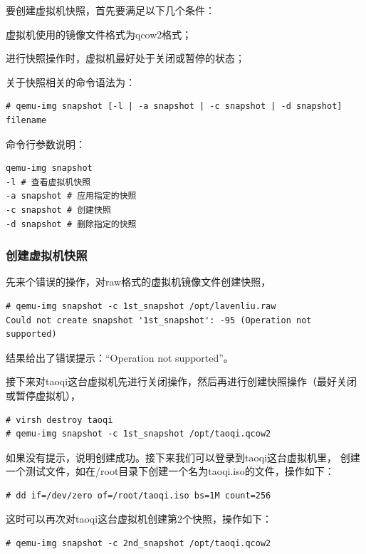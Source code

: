 要创建虚拟机快照，首先要满足以下几个条件：

虚拟机使用的镜像文件格式为qcow2格式；

进行快照操作时，虚拟机最好处于关闭或暂停的状态；

关于快照相关的命令语法为：

\begin{verbatim}
# qemu-img snapshot [-l | -a snapshot | -c snapshot | -d snapshot] filename
\end{verbatim}

命令行参数说明：

\begin{verbatim}
qemu-img snapshot 
-l # 查看虚拟机快照
-a snapshot # 应用指定的快照
-c snapshot # 创建快照
-d snapshot # 删除指定的快照
\end{verbatim}

\subsubsection{创建虚拟机快照}
\label{sec:createVmSnapShot}

先来个错误的操作，对raw格式的虚拟机镜像文件创建快照，

\begin{verbatim}
# qemu-img snapshot -c 1st_snapshot /opt/lavenliu.raw 
Could not create snapshot '1st_snapshot': -95 (Operation not supported)
\end{verbatim}

结果给出了错误提示：“Operation not supported”。

接下来对taoqi这台虚拟机先进行关闭操作，然后再进行创建快照操作（最好关闭或暂停虚拟机），

\begin{verbatim}
# virsh destroy taoqi
# qemu-img snapshot -c 1st_snapshot /opt/taoqi.qcow2
\end{verbatim}

如果没有提示，说明创建成功。接下来我们可以登录到taoqi这台虚拟机里，
创建一个测试文件，如在/root目录下创建一个名为taoqi.iso的文件，操作如下：

\begin{verbatim}
# dd if=/dev/zero of=/root/taoqi.iso bs=1M count=256
\end{verbatim}

这时可以再次对taoqi这台虚拟机创建第2个快照，操作如下：

\begin{verbatim}
# qemu-img snapshot -c 2nd_snapshot /opt/taoqi.qcow2
\end{verbatim}

